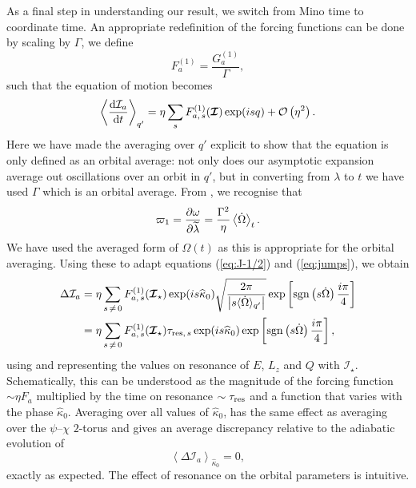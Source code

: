 As a final step in understanding our result, we switch from Mino time to coordinate time. An appropriate redefinition of the forcing functions can be done by scaling by $\Gamma$, we define
\begin{equation}
F_a^{(1)} = \dfrac{G_a^{(1)}}{\Gamma},
\end{equation}
such that the equation of motion becomes
\begin{equation}
\left\langle \dfrac{\mathrm{d} {\mathcal{I}_a}}{\mathrm{d} {t}}\right\rangle_{q'} =  \eta\sum_s F_{a,\,s}^{(1)}(\boldsymbol{\mathcal{I}})\exp(is q) + \mathcal{O}\left({\eta^2}\right).
\end{equation}
Here we have made the averaging over $q'$ explicit to show that the equation is only defined as an orbital average: not only does our asymptotic expansion average out oscillations over an orbit in $q'$, but in converting from $\lambda$ to $t$ we have used $\Gamma$ which is an orbital average.
From , we recognise that
\begin{equation}
\varpi_1 = \dfrac{\partial {\omega}}{\partial {\widetilde{\lambda}}} = \dfrac{\Gamma^2}{\eta}\left\langle\dot{\Omega}\right\rangle_t.
\end{equation}
We have used the averaged form of $\Omega(t)$ as this is appropriate for the orbital averaging. Using these to adapt equations (\ref{eq:J-1/2}) and (\ref{eq:jumps}), we obtain
\begin{align}
\Delta \mathcal{I}_a = {} & \eta\sum_{s\,\neq\,0}F_{a,\,s}^{(1)}(\boldsymbol{\mathcal{I}}_\star)\exp(is \widehat{\kappa}_0)\sqrt{\dfrac{2\pi}{\left|s \langle\dot{\Omega}\rangle_{q'}\right|}}\exp\left[\operatorname{sgn}\left(s\dot{\Omega}\right)\dfrac{i\pi}{4}\right] \\
 = {} & \eta\sum_{s\,\neq\,0}F_{a,\,s}^{(1)}(\boldsymbol{\mathcal{I}}_\star)\tau_{\mathrm{res},\,s}\exp(is \widehat{\kappa}_0)\exp\left[\operatorname{sgn}\left(s\dot{\Omega}\right)\dfrac{i\pi}{4}\right],
\end{align}
using  and representing the values on resonance of $E$, $L_z$ and $Q$ with $\boldsymbol{\mathcal{I}}_\star$. Schematically, this can be understood as the magnitude of the forcing function $\sim \eta F_a$ multiplied by the time on resonance $\sim \tau_\mathrm{res}$ and a function that varies with the phase $\widehat{\kappa}_0$. Averaging over all values of $\widehat{\kappa}_0$, has the same effect as averaging over the $\psi$--$\chi$ $2$-torus and gives an average discrepancy relative to the adiabatic evolution of
\begin{equation}
\left\langle \Delta \mathcal{I}_a \right\rangle_{\hat{\kappa}_0} = 0,
\end{equation}
exactly as expected. The effect of resonance on the orbital parameters is intuitive.

